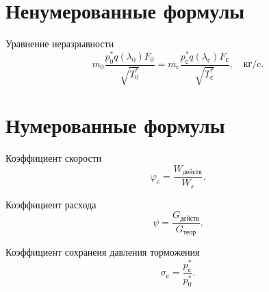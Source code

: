 \documentclass[a4paper, 12pt]{article}
\begin{document}
\section{Ненумерованные формулы}

Уравнение неразрывности
$$
m_0 \dfrac{p_0^*q(\lambda_0)F_0}{\sqrt{T_0^*}} = 
m_\text{с}\dfrac{p_\text{с}^*q(\lambda_\text{с})
F_\text{с}}{\sqrt{T_\text{с}^*}}, \quad\text{кг/c}.
$$

\section{Нумерованные формулы}

Коэффициент скорости
\begin{equation}
\varphi_\text{c} = \dfrac{W_\text{действ}}{W_s}.
\end{equation}

Коэффициент расхода
\begin{equation}
\psi = \dfrac{G_\text{действ}}{G_\text{теор}}.
\end{equation}

Коэффициент сохранеия давления торможения
\begin{equation}
\sigma_\text{с} = \dfrac{p_\text{с}^*}{p^*_0}.
\end{equation}
\end{document}

